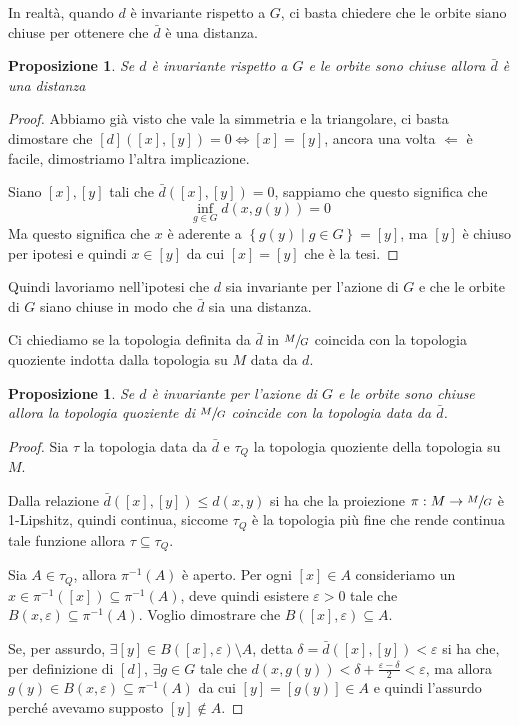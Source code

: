 \documentclass[a4paper,10pt]{article}
\newcounter{counter1}
\theoremstyle{plain}
\newtheorem{mypro}[counter1]{Proposizione}
\theoremstyle{definition}
\theoremstyle{remark}
\newcommand{\set}[1]{\left\{#1\right\}}
\newcommand{\bra}[1]{\left[#1\right]}
\begin{document}
In realtà, quando $d$ è invariante rispetto a $G$, ci basta chiedere
che le orbite siano chiuse per ottenere che $\bar d$ è una distanza.

\begin{mypro}
  Se $d$ è invariante rispetto a $G$ e le orbite sono chiuse allora
  $\bar d$ è una distanza
\end{mypro}
\begin{proof}
  Abbiamo già visto che vale la simmetria e la triangolare, ci basta
  dimostare che $\bra d (\bra{x},\bra{y}) = 0 \Leftrightarrow \bra{x}
  = \bra{y}$, ancora una volta $\Leftarrow$ è facile, dimostriamo
  l'altra implicazione.

  Siano $\bra{x}, \bra{y}$ tali che $\bar d ( \bra{x} , \bra{y}) = 0$,
  sappiamo che questo significa che
  \[ \inf _{g \in G} d(x,g(y)) = 0 \]
  Ma questo significa che $x$ è aderente a $\set{g(y)\mid g \in G} =
  \bra{y}$, ma $\bra{y}$ è chiuso per ipotesi e quindi $x \in \bra{y}$
  da cui $\bra{x} = \bra{y}$ che è la tesi.
\end{proof}

Quindi lavoriamo nell'ipotesi che $d$ sia invariante per l'azione di
$G$ e che le orbite di $G$ siano chiuse in modo che $\bar d$ sia una
distanza.

Ci chiediamo se la topologia definita da $\bar d$ in $\sfrac{M}{G}$
coincida con la topologia quoziente indotta dalla topologia su $M$
data da $d$.
\begin{mypro}
  Se $d$ è invariante per l'azione di $G$ e le orbite sono chiuse
  allora la topologia quoziente di $\sfrac{M}{G}$ coincide con la
  topologia data da $\bar d$.
\end{mypro}
\begin{proof}
  Sia $\tau$ la topologia data da $\bar d$ e $\tau _Q$ la topologia
  quoziente della topologia su $M$.

  Dalla relazione $\bar d ( \bra{x}, \bra{y} ) \le d(x,y)$ si ha che
  la proiezione $\pi : M \to \sfrac{M}{G}$ è 1-Lipshitz, quindi
  continua, siccome $\tau _Q$ è la topologia più fine che rende
  continua tale funzione allora $\tau \subseteq \tau _Q$.

  Sia $A \in \tau _Q$, allora $\pi ^{-1}(A)$ è aperto. Per ogni
  $\bra{x} \in A$ consideriamo un $x \in \pi^{-1}(\bra{x}) \subseteq
  \pi ^{-1}(A)$, deve quindi esistere $\varepsilon >0$ tale che
  $B(x,\varepsilon) \subseteq \pi ^{-1}(A)$. Voglio dimostrare che
  $B(\bra{x}, \varepsilon ) \subseteq A$.

  Se, per assurdo, $\exists \bra{y} \in B(\bra{x}, \varepsilon )
  \setminus A$, detta $\delta = \bar d (\bra{x}, \bra{y}) <
  \varepsilon$ si ha che, per definizione di $\bra d$, $\exists g \in
  G$ tale che $d(x,g(y)) < \delta + \frac{\varepsilon - \delta}{2} <
  \varepsilon$, ma allora $g(y) \in B(x,\varepsilon) \subseteq \pi
  ^{-1} (A)$ da cui $\bra{y} = \bra{g(y)} \in A$ e quindi l'assurdo
  perché avevamo supposto $\bra{y} \not\in A$.
\end{proof}
\end{document}
